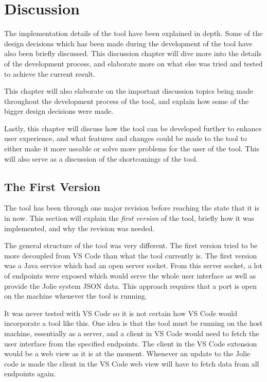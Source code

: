 \chapter{Discussion}
The implementation details of the tool have been explained in depth. Some of the design decisions which has been made during the development of the tool have also been briefly discussed.
This discussion chapter will dive more into the details of the development process, and elaborate more on what else was tried and tested to achieve the current result.

This chapter will also elaborate on the important discussion topics being made throughout the development process of the tool, and explain how
some of the bigger design decisions were made.

Lastly, this chapter will discuss how the tool can be developed further to enhance user experience, and what features and changes could be made to the tool to either make it more useable
or solve more problems for the user of the tool. This will also serve as a discussion of the shortcomings of the tool.

\section{The First Version}
The tool has been through one major revision before reaching the state that it is in now. This section
will explain the \textit{first version} of the tool, briefly how it was implemented, and why the revision was needed.

The general structure of the tool was very different. The first version tried to be more decoupled from VS Code than what the tool currently is.
The first version was a Java service which had an open server socket. From this server socket, a lot of endpoints were exposed which would serve the whole user interface as well as provide the Jolie system JSON data.
This approach requires that a port is open on the machine whenever the tool is running.

It was never tested with VS Code so it is not certain how VS Code would incorporate a tool like this. One idea is
that the tool must be running on the host machine, essentially as a server, and a client in VS Code would need to fetch the user interface from the specified endpoints.
The client in the VS Code extension would be a web view as it is at the moment.
Whenever an update to the Jolie code is made the client in the VS Code web view will have to fetch data from all endpoints again.

